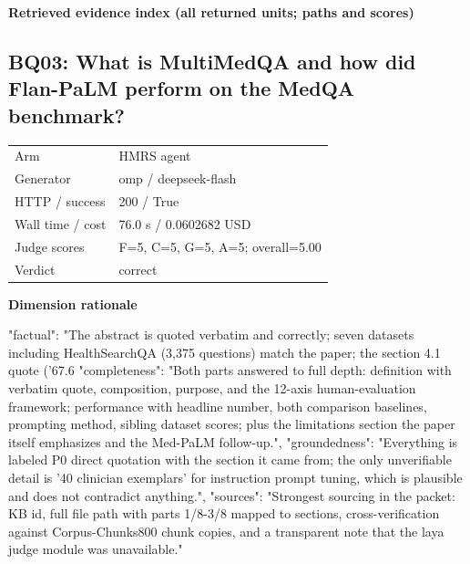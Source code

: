 \documentclass[10pt]{article}
\begin{document}
\textbf{Retrieved evidence index (all returned units; paths and scores) }
\begin{EvidenceText}
\end{EvidenceText}
\subsection{BQ03: What is MultiMedQA and how did Flan-PaLM perform on the MedQA benchmark?}
\begin{tabular}{@{}ll@{}}
Arm & HMRS agent\\
Generator & omp / deepseek-flash\\
HTTP / success & 200 / True\\
Wall time / cost & 76.0 s / 0.0602682 USD\\
Judge scores & F=5, C=5, G=5, A=5; overall=5.00\\
Verdict & correct\\
\end{tabular}

\textbf{Dimension rationale}
\begin{EvidenceText}
{
  "factual": "The abstract is quoted verbatim and correctly; seven datasets including HealthSearchQA (3,375 questions) match the paper; the section 4.1 quote ('67.6%
  "completeness": "Both parts answered to full depth: definition with verbatim quote, composition, purpose, and the 12-axis human-evaluation framework; performance with headline number, both comparison baselines, prompting method, sibling dataset scores; plus the limitations section the paper itself emphasizes and the Med-PaLM follow-up.",
  "groundedness": "Everything is labeled P0 direct quotation with the section it came from; the only unverifiable detail is '40 clinician exemplars' for instruction prompt tuning, which is plausible and does not contradict anything.",
  "sources": "Strongest sourcing in the packet: KB id, full file path with parts 1/8-3/8 mapped to sections, cross-verification against Corpus-Chunks800 chunk copies, and a transparent note that the laya judge module was unavailable."
}
\end{EvidenceText}
\end{document}
